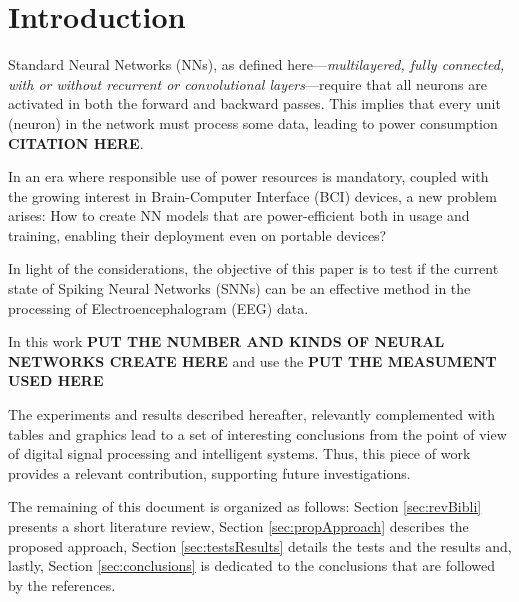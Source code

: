 \section{Introduction}
\label{introduction}
	\par Standard Neural Networks (NNs), as defined here—\textit{multilayered, fully connected, with or without recurrent or convolutional layers}—require that all neurons are activated in both the forward and backward passes. This implies that every unit (neuron) in the network must process some data, leading to power consumption \textbf{CITATION HERE}.
	
	\par In an era where responsible use of power resources is mandatory, coupled with the growing interest in Brain-Computer Interface (BCI) devices, a new problem arises: How to create NN models that are power-efficient both in usage and training, enabling their deployment even on portable devices?

	\par In light of the considerations, the objective of this paper is to test if the current state of Spiking Neural Networks (SNNs) can be an effective method in the processing of Electroencephalogram (EEG) data.
	
	\par In this work \textbf{PUT THE NUMBER AND KINDS OF NEURAL NETWORKS CREATE HERE} and use the \textbf{PUT THE MEASUMENT USED HERE} 

	\par The experiments and results described hereafter, relevantly complemented with tables and graphics lead to a set of interesting conclusions from the point of view of digital signal processing and intelligent systems. Thus, this piece of work provides a relevant contribution, supporting future investigations.
	
	\par The remaining of this document is organized as follows: Section \ref{sec:revBibli} presents a short literature review, Section \ref{sec:propApproach} describes the proposed approach, Section \ref{sec:testsResults} details the tests and the results and, lastly, Section \ref{sec:conclusions} is dedicated to the conclusions that are followed by the references. 